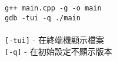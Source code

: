 \lstinline[]|g++ main.cpp -g -o main| \\
\lstinline[]|gdb -tui -q ./main| \\ \\
\verb|[-tui]| - 在終端機顯示檔案 \\
\verb|[-q]| - 在初始設定不顯示版本 \\